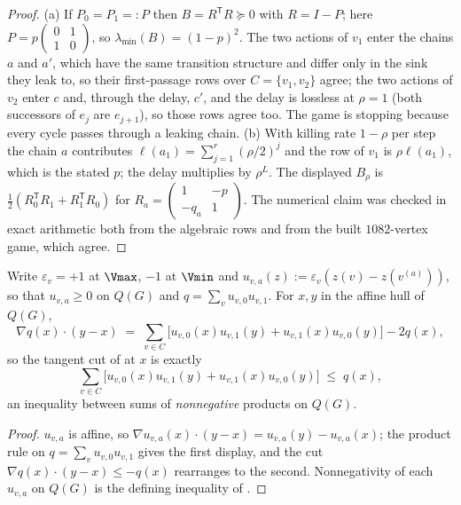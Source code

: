 \begin{proof}
(a) If $P_0=P_1=:P$ then $B=R^{\mathsf T}R\succeq0$ with $R=I-P$; here
$P=p\left(\begin{smallmatrix}0&1\\1&0\end{smallmatrix}\right)$, so
$\lambda_{\min}(B)=(1-p)^2$. The two actions of $v_1$ enter the chains $a$ and
$a'$, which have the same transition structure and differ only in the sink
they leak to, so their first-passage rows over $C=\{v_1,v_2\}$ agree; the two
actions of $v_2$ enter $c$ and, through the delay, $c'$, and the delay is
lossless at $\rho=1$ (both successors of $e_j$ are $e_{j+1}$), so those rows
agree too. The game is stopping because every cycle passes through a leaking
chain.
(b) With killing rate $1-\rho$ per step the chain $a$ contributes
$\ell(a_1)=\sum_{j=1}^{r}(\rho/2)^{j}$ and the row of $v_1$ is $\rho\ell(a_1)$,
which is the stated $p$; the delay multiplies by $\rho^{L}$. The displayed
$B_\rho$ is $\tfrac12(R_0^{\mathsf T}R_1+R_1^{\mathsf T}R_0)$ for
$R_a=\left(\begin{smallmatrix}1&-p\\-q_a&1\end{smallmatrix}\right)$. The
numerical claim was checked in exact arithmetic both from the algebraic rows
and from the built $1082$-vertex game, which agree.
\end{proof}

\begin{proposition}\label{ht:prop-cutform}
Write $\varepsilon_v=+1$ at $\Vmax$, $-1$ at $\Vmin$ and
$u_{v,a}(z):=\varepsilon_v(z(v)-z(v^{(a)}))$, so that $u_{v,a}\ge0$ on $Q(G)$
and $q=\sum_{v}u_{v,0}u_{v,1}$. For $x,y$ in the affine hull of $Q(G)$,
\[
  \nabla q(x)\cdot(y-x)\;=\;\sum_{v\in C}\bigl[u_{v,0}(x)u_{v,1}(y)+u_{v,1}(x)u_{v,0}(y)\bigr]-2q(x),
\]
so the tangent cut of  at $x$ is exactly
\[
  \sum_{v\in C}\bigl[u_{v,0}(x)u_{v,1}(y)+u_{v,1}(x)u_{v,0}(y)\bigr]\;\le\;q(x),
\]
an inequality between sums of \emph{nonnegative} products on $Q(G)$.
\end{proposition}

\begin{proof}
$u_{v,a}$ is affine, so $\nabla u_{v,a}(x)\cdot(y-x)=u_{v,a}(y)-u_{v,a}(x)$;
the product rule on $q=\sum_v u_{v,0}u_{v,1}$ gives the first display, and the
cut $\nabla q(x)\cdot(y-x)\le-q(x)$ rearranges to the second. Nonnegativity of
each $u_{v,a}$ on $Q(G)$ is the defining inequality of .
\end{proof}

